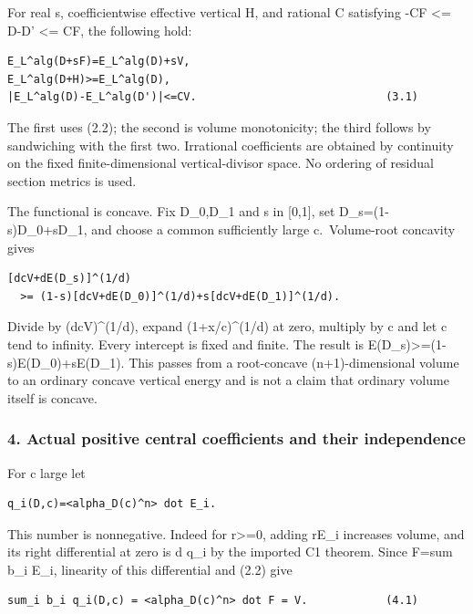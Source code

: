 \documentclass[
  10pt,
]{article}
\begin{document}
For real s, coefficientwise effective vertical H, and rational C
satisfying -CF \textless= D-D' \textless= CF, the following hold:

\begin{verbatim}
E_L^alg(D+sF)=E_L^alg(D)+sV,
E_L^alg(D+H)>=E_L^alg(D),
|E_L^alg(D)-E_L^alg(D')|<=CV.                             (3.1)
\end{verbatim}

The first uses (2.2); the second is volume monotonicity; the third
follows by sandwiching with the first two. Irrational coefficients are
obtained by continuity on the fixed finite-dimensional vertical-divisor
space. No ordering of residual section metrics is used.

The functional is concave. Fix D\_0,D\_1 and s in {[}0,1{]}, set
D\_s=(1-s)D\_0+sD\_1, and choose a common sufficiently large
c.~Volume-root concavity gives

\begin{verbatim}
[dcV+dE(D_s)]^(1/d)
  >= (1-s)[dcV+dE(D_0)]^(1/d)+s[dcV+dE(D_1)]^(1/d).
\end{verbatim}

Divide by (dcV)\^{}(1/d), expand (1+x/c)\^{}(1/d) at zero, multiply by c
and let c tend to infinity. Every intercept is fixed and finite. The
result is E(D\_s)\textgreater=(1-s)E(D\_0)+sE(D\_1). This passes from a
root-concave (n+1)-dimensional volume to an ordinary concave vertical
energy and is not a claim that ordinary volume itself is concave.

\subsubsection{4. Actual positive central coefficients and their
independence}\label{actual-positive-central-coefficients-and-their-independence}

For c large let

\begin{verbatim}
q_i(D,c)=<alpha_D(c)^n> dot E_i.
\end{verbatim}

This number is nonnegative. Indeed for r\textgreater=0, adding rE\_i
increases volume, and its right differential at zero is d q\_i by the
imported C1 theorem. Since F=sum b\_i E\_i, linearity of this
differential and (2.2) give

\begin{verbatim}
sum_i b_i q_i(D,c) = <alpha_D(c)^n> dot F = V.            (4.1)
\end{verbatim}
\end{document}
